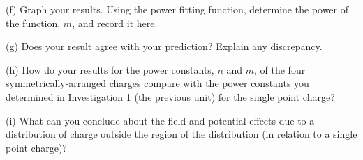 (f) Graph your results. Using the power fitting
function, determine the power of the function, $m$, and record it here.
\vspace{20mm}

(g) Does your result agree with your prediction? Explain any discrepancy.\vspace{20mm}

(h) How do your results for the power constants, $n$ and $m$, of the four
symmetrically-arranged charges compare with the power constants you
determined in Investigation 1 (the previous unit) for the single point charge?\vspace{20mm}

(i) What can you conclude about the field and potential effects due to
a distribution of charge outside the region of the distribution (in
relation to a single point charge)?

